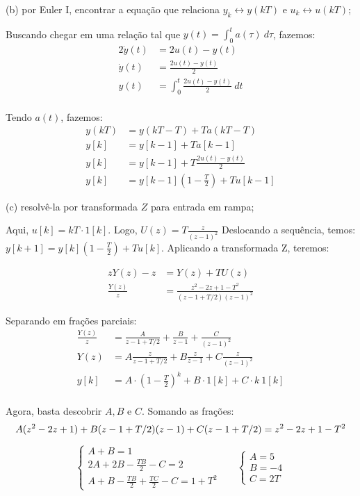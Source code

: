 \documentclass[10pt]{article}
\begin{document}
(b) por Euler I, encontrar a equação que relaciona $y_k \leftrightarrow y(kT)$ e $u_k \leftrightarrow u(kT)$;

Buscando chegar em uma relação tal que $y(t) = \int_{0}^{t} a(\tau) \ d\tau$, fazemos:
\begin{align*}
    2 \dot{y}(t) &= 2u(t) - y(t)\\
    \dot{y}(t) &= \frac{2u(t) - y(t)}{2}\\
    y(t) &= \int_{0}^{t} \frac{2u(t) - y(t)}{2} \ dt\\
\end{align*}

Tendo $a(t)$, fazemos:
\begin{align*}
    y(kT) &= y(kT -T) + Ta(kT - T)\\
    y[k] &= y[k - 1] + Ta[k - 1]\\
    y[k] &= y[k - 1] + T \frac{2u(t) - y(t)}{2}\\
    y[k] &= y[k - 1] \left(1 - \frac{T}{2}\right) + Tu[k - 1]
\end{align*}

(c) resolvê-la por transformada $Z$ para entrada em rampa;

Aqui, $u[k] = kT \cdot 1[k]$. Logo, $U(z) = T\frac{z}{(z - 1)^2}$
Deslocando a sequência, temos: $y[k + 1] = y[k] \left(1 - \frac{T}{2}\right) + Tu[k]$. Aplicando a transformada Z, teremos:

\begin{align*}
    zY(z) - z &= Y(z) + T U(z)\\
    \frac{Y(z)}{z} &= \frac{z^2 -2z + 1 - T^2}{(z - 1 + T/2)(z-1)^2}
\end{align*}

Separando em frações parciais:
\begin{align*}
    \frac{Y(z)}{z} &= \frac{A}{z - 1 + T/2} + \frac{B}{z - 1} + \frac{C}{(z - 1)^2}\\
    Y(z) &= A\frac{z}{z - 1 + T/2} + B\frac{z}{z - 1} + C\frac{z}{(z - 1)^2}\\
    y[k] &= A \cdot \left(1 - \frac{T}{2}\right)^k + B \cdot 1[k] + C \cdot k\ 1[k]\\
\end{align*}

Agora, basta descobrir $A, B$ e $C$. Somando as frações:
\[A (z^2 - 2z + 1) + B (z - 1 + T/2)(z - 1) + C (z - 1 + T/2) = z^2 -2z + 1 - T^2\\\]
\begin{align*}
    \begin{cases}
        A + B = 1\\
        2A + 2B - \frac{TB}{2} - C = 2\\
        A + B - \frac{TB}{2} + \frac{TC}{2} - C = 1 + T^2
    \end{cases}
    & &
    \begin{cases}
        A = 5\\
        B = -4\\
        C = 2T
    \end{cases}
\end{align*}
\end{document}
